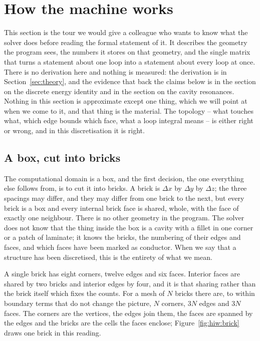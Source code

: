\section{How the machine works}\label{sec:howitworks}

This section is the tour we would give a colleague who wants to know what the solver does before reading the
formal statement of it. It describes the geometry the program sees, the numbers it stores on that geometry, and
the single matrix that turns a statement about one loop into a statement about every loop at once. There is no
derivation here and nothing is measured: the derivation is in Section~\ref{sec:theory}, and the evidence that
back the claims below is in the section on the discrete energy identity and in the section on the cavity
resonances. Nothing in this section is approximate except one thing, which we will point at when we come to it,
and that thing is the material. The topology -- what touches what, which edge bounds which face, what a loop
integral means -- is either right or wrong, and in this discretisation it is right.

\subsection{A box, cut into bricks}\label{sec:hiw:bricks}

The computational domain is a box, and the first decision, the one everything else follows from, is to cut it
into bricks. A brick is $\Delta x$ by $\Delta y$ by $\Delta z$; the three spacings may differ, and they may
differ from one brick to the next, but every brick is a box and every internal brick face is shared, whole, with
the face of exactly one neighbour. There is no other geometry in the program. The solver does not know that the
thing inside the box is a cavity with a fillet in one corner or a patch of laminate; it knows the bricks, the
numbering of their edges and faces, and which faces have been marked as conductor. When we say that a structure
has been discretised, this is the entirety of what we mean.

A single brick has eight corners, twelve edges and six faces. Interior faces are shared by two bricks and
interior edges by four, and it is that sharing rather than the brick itself which fixes the counts. For a mesh
of $N$ bricks there are, to within boundary terms that do not change the picture, $N$ corners, $3N$ edges and
$3N$ faces. The corners are the vertices, the edges join them, the faces are spanned by the edges and the bricks
are the cells the faces enclose; Figure~\ref{fig:hiw:brick} draws one brick in this reading.

